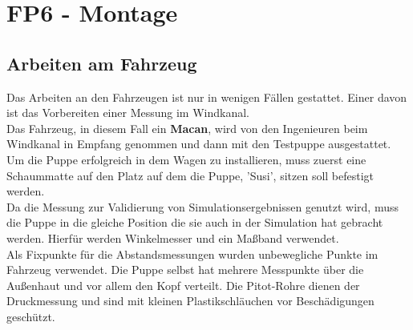 \newpage
\section{FP6 - Montage}

\subsection{Arbeiten am Fahrzeug}

Das Arbeiten an den Fahrzeugen ist nur in wenigen Fällen gestattet. Einer davon ist das Vorbereiten einer Messung im Windkanal. \\

Das Fahrzeug, in diesem Fall ein \textbf{Macan},  wird von den Ingenieuren beim Windkanal in Empfang genommen und dann mit den Testpuppe ausgestattet. \\

Um die Puppe erfolgreich in dem Wagen zu installieren, muss zuerst eine Schaummatte auf den Platz auf dem die Puppe, 'Susi', sitzen soll befestigt werden. \\
Da die Messung zur Validierung von Simulationsergebnissen genutzt wird, muss die Puppe in die gleiche Position die sie auch in der Simulation hat gebracht werden. Hierfür werden Winkelmesser und ein Maßband verwendet. \\
Als Fixpunkte für die Abstandsmessungen wurden unbewegliche Punkte im Fahrzeug verwendet. Die Puppe selbst hat mehrere Messpunkte über die Außenhaut und vor allem den Kopf verteilt. Die Pitot-Rohre dienen der Druckmessung und sind mit kleinen Plastikschläuchen vor Beschädigungen geschützt. 

